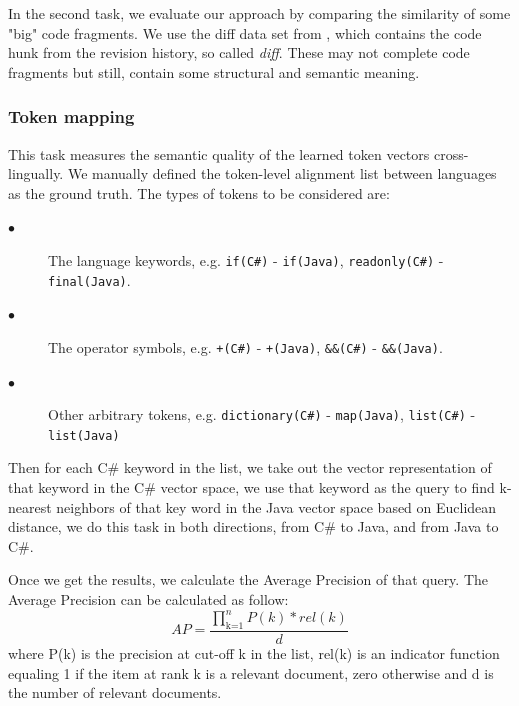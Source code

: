 In the second task, we evaluate our approach by comparing the similarity of some "big" code fragments. We use the diff data set from \cite{cheng2017clcminer}, which contains the code hunk from the revision history, so called \textit{diff}. These may not complete code fragments but still, contain some structural and semantic meaning.
\subsubsection{Token mapping}
This task measures the semantic quality of the learned token vectors cross-lingually.  We manually defined the token-level alignment list between languages as the ground truth. The types of tokens to be considered are:
\begin{description}
	\item [$\bullet$] The language keywords, e.g. \texttt{if(C\#)} - \texttt{if(Java)}, \texttt{readonly(C\#)} - \texttt{final(Java)}.
	\item [$\bullet$] The operator symbols, e.g. \texttt{+(C\#)} - \texttt{+(Java)}, \texttt{\&\&(C\#)} - \texttt{\&\&(Java)}.
	\item [$\bullet$] Other arbitrary tokens, e.g. \texttt{dictionary(C\#)} - \texttt{map(Java)}, \texttt{list(C\#)} - \texttt{list(Java)}
\end{description}

Then for each C\# keyword in the list, we take out the vector representation of that keyword in the C\# vector space, we use that keyword as the query to find k-nearest neighbors of that key word in the Java vector space based on Euclidean distance, we do this task in both directions, from C\# to Java, and from Java to C\#. 

Once we get the results, we calculate the Average Precision of that query. 
The Average Precision can be calculated as follow:
\begin{displaymath}
AP = \frac{\prod_\text{k=1}^n P(k)*rel(k)}{d}
\end{displaymath}
where P(k) is the precision at cut-off k in the list, rel(k) is an indicator function equaling 1 if the item at rank k is a relevant document, zero otherwise and d is the number of relevant documents.

